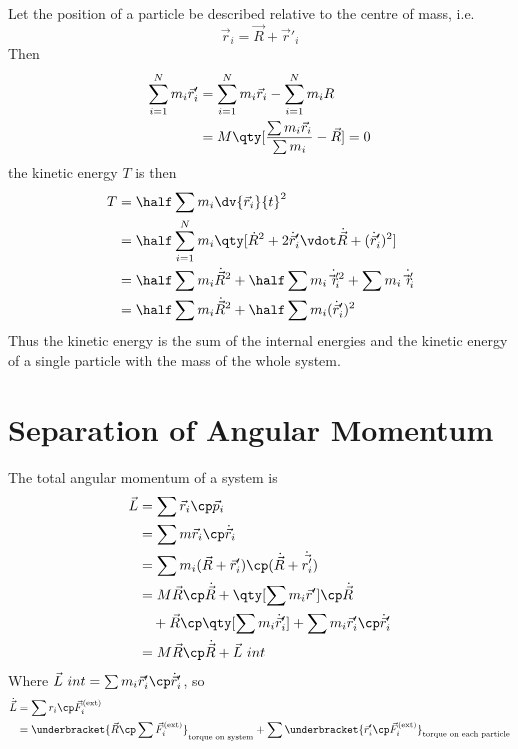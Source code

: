 Let the position of a particle be described relative to the centre of mass, i.e.
\[ \vec{r}_i = \vec{R} + \vec{r}'_i \]
Then
\begin{align*}
  \sum_{i=1}^N m_i \vec{r}'_i &= \sum^N_{i=1} m_i \vec{r}_i - \sum_{i=1}^N m_i R \\
&= M \qty[ \frac{\sum m_i \vec{r}_i}{\sum m_i } - \vec{R}] = 0
\end{align*}
the kinetic energy $T$ is then
\begin{align}
  T &= \half \sum m_i \dv{\vec{r}_i}{t}^2 \nonumber\\
&= \half \sum_{i=1}^N m_i \qty[ \dot{R}^2 + 2 \dot{\vec{r}}'_i \vdot \dot{\vec{R}} + (\dot{\vec{r}}'_i)^2 ] \nonumber\\
&= \half \sum m_i \dot{\vec{R}}^2 + \half \sum m_i \dot{\vec{r}'_i}^2 + \sum m_i \dot{\vec{r}_i'} \nonumber\\
&= \half \sum m_i \dot{\vec{R}}^2 + \half \sum m_i (\dot{\vec{r}}'_i)^2
\end{align}
Thus the kinetic energy is the sum of the internal energies and the
kinetic energy of a single particle with the mass of the whole system.

\section{Separation of Angular Momentum}
\label{sec:separ-angul-moment}

The total angular momentum of a system is
\begin{align}
  \vec{L} &= \sum \vec{r}_i \cp \vec{p}_i \nonumber \\ &= \sum m \vec{r}_i \cp \dot{\vec{r}}_i \nonumber\\
&= \sum m_i (\vec{R} + \vec{r}_i') \cp (\dot{\vec{R}} + \dot{\vec{r'}}_i ) \nonumber\\
&= M \vec{R} \cp \dot{\vec{R}} + \qty[ \sum m_i \vec{r}' ] \cp \dot{\vec{R}} \nonumber\\ & \quad+ \vec{R} \cp \qty[ \sum m_i \dot{\vec{r}}'_i ] + \sum m_i \vec{r}'_i \cp \dot{\vec{r}}'_i \nonumber\\
&= M \vec{R} \cp \dot{\vec{R}} + \vec{L}~{int}
\end{align}
Where $\vec{L}~{int} = \sum m_i \vec{r}'_i \cp \dot{\vec{r}}'_i$, so
\begin{align}
  \dot{\vec{L}} &= \sum r_i \cp \vec{F}_i^{\rm (ext)} \nonumber\\
 &= \underbracket{\vec{R} \cp \sum \vec{F}_i^{\rm (ext)}}_{\text{torque on system}} + \sum \underbracket{\vec{r}'_i \cp \vec{F}_i^{\rm (ext)}}_{\text{torque on each particle}}
\end{align}

